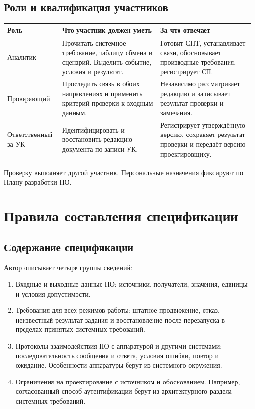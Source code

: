\documentclass{tpks}
\begin{document}
\subsection{Роли и квалификация участников}
\par\noindent\begin{minipage}{\linewidth}
\begin{tabularx}{\linewidth}{|P{3.3cm}|L|L|}
\hline \textbf{Роль} & \textbf{Что участник должен уметь} & \textbf{За что отвечает} \\ \hline
Аналитик & Прочитать системное требование, таблицу обмена и сценарий. Выделить событие, условия и результат. & Готовит СПТ, устанавливает связи, обосновывает производные требования, регистрирует СП. \\ \hline
Проверяющий & Проследить связь в обоих направлениях и применить критерий проверки к входным данным. & Независимо рассматривает редакцию и записывает результат проверки и замечания. \\ \hline
Ответственный за УК & Идентифицировать и восстановить редакцию документа по записи УК. & Регистрирует утверждённую версию, сохраняет результат проверки и передаёт версию проектировщику. \\ \hline
\end{tabularx}
\end{minipage}\par
Проверку выполняет другой участник. Персональные назначения фиксируют по Плану разработки ПО.

\section{Правила составления спецификации}
\subsection{Содержание спецификации}
Автор описывает четыре группы сведений:
\begin{enumerate}
\item Входные и выходные данные ПО: источники, получатели, значения, единицы и условия допустимости.
\item Требования для всех режимов работы: штатное продвижение, отказ, неизвестный результат задания и восстановление после перезапуска в пределах принятых системных требований.
\item Протоколы взаимодействия ПО с аппаратурой и другими системами: последовательность сообщения и ответа, условия ошибки, повтор и ожидание. Особенности аппаратуры берут из системного окружения.
\item Ограничения на проектирование с источником и обоснованием. Например, согласованный способ аутентификации берут из архитектурного раздела системных требований.
\end{enumerate}
\end{document}
